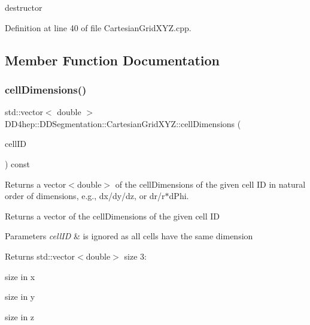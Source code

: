 destructor 



Definition at line 40 of file Cartesian\+Grid\+X\+Y\+Z.\+cpp.



\subsection{Member Function Documentation}
\hypertarget{class_d_d4hep_1_1_d_d_segmentation_1_1_cartesian_grid_x_y_z_a98f90a0621c750a6bdbcdbb27468b3a1}{}\label{class_d_d4hep_1_1_d_d_segmentation_1_1_cartesian_grid_x_y_z_a98f90a0621c750a6bdbcdbb27468b3a1} 
\subsubsection{\texorpdfstring{cell\+Dimensions()}{cellDimensions()}}
{\footnotesize\ttfamily std\+::vector$<$ double $>$ D\+D4hep\+::\+D\+D\+Segmentation\+::\+Cartesian\+Grid\+X\+Y\+Z\+::cell\+Dimensions (\begin{DoxyParamCaption}\item[{const \hyperlink{namespace_d_d4hep_1_1_d_d_segmentation_ac7af071d85cb48820914434a07e21ba1}{Cell\+ID} \&}]{cell\+ID }\end{DoxyParamCaption}) const\hspace{0.3cm}{\ttfamily [virtual]}}



Returns a vector$<$double$>$ of the cell\+Dimensions of the given cell ID in natural order of dimensions, e.\+g., dx/dy/dz, or dr/r$\ast$d\+Phi. 

Returns a vector of the cell\+Dimensions of the given cell ID 
\begin{DoxyParams}{Parameters}
{\em cell\+ID} & is ignored as all cells have the same dimension \\
\hline
\end{DoxyParams}
\begin{DoxyReturn}{Returns}
std\+::vector$<$double$>$ size 3\+:
\begin{DoxyEnumerate}
\item size in x
\item size in y
\item size in z 
\end{DoxyEnumerate}
\end{DoxyReturn}


